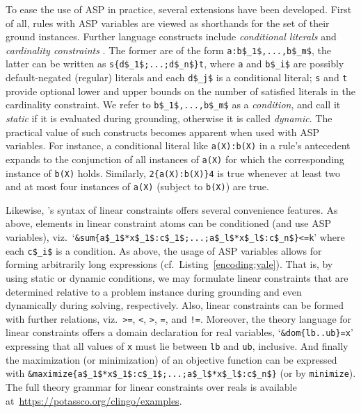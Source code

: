 To ease the use of ASP in practice, 
several extensions have been developed. 
First of all, rules with ASP variables are viewed as shorthands for the set of their ground instances.
Further language constructs include
\emph{conditional literals} and \emph{cardinality constraints} \cite{siniso02a}.
The former are of the form
\lstinline[mathescape]{a:b$_1$,...,b$_m$},
the latter can be written as
\lstinline[mathescape]+s{d$_1$;...;d$_n$}t+,
where \lstinline{a} and \lstinline[mathescape]{b$_i$} are possibly default-negated (regular) literals  %
and each \lstinline[mathescape]{d$_j$} is a conditional literal; %
\lstinline{s} and \lstinline{t} provide optional lower and upper bounds on the number of satisfied literals in the cardinality constraint.
We refer to \lstinline[mathescape]{b$_1$,...,b$_m$} as a \emph{condition},
and call it \textit{static} if it is evaluated during grounding, otherwise it is called \textit{dynamic}.
%
The practical value of such constructs becomes apparent when used with ASP variables. 
For instance, a conditional literal like
\lstinline[mathescape]{a(X):b(X)}
in a rule's antecedent expands to the conjunction of all instances of \lstinline{a(X)} for which the corresponding instance of \lstinline{b(X)} holds.
%
Similarly,
\lstinline[mathescape]+2{a(X):b(X)}4+
is true whenever at least two and at most four instances of \lstinline{a(X)} (subject to \lstinline{b(X)}) are true.
%

Likewise,
\clingo's syntax of linear constraints offers several convenience features.
As above,
elements in linear constraint atoms can be conditioned (and use ASP variables),
viz.\
`\lstinline[mathescape]@&sum{a$_1$*x$_1$:c$_1$;...;a$_l$*x$_l$:c$_n$}<=k@'
where each \lstinline[mathescape]{c$_i$} is a condition.
As above, the usage of ASP variables allows for forming arbitrarily long expressions
(cf.\ Listing~\ref{encoding:yale}).
That is, by using static or dynamic conditions,
we may formulate linear constraints that are determined relative to a problem instance during grounding
and even dynamically during solving, respectively. 
Also, linear constraints can be formed with further relations, viz.\
\texttt{>=},
\texttt{<},
\texttt{>},
\texttt{=},
and
\texttt{!=}.
Moreover, the theory language for linear constraints offers a domain declaration for real variables,
`\lstinline[mathescape]@&dom{lb..ub}=x@'
expressing that all values of \texttt{x} must lie between \texttt{lb} and \texttt{ub}, inclusive.
And finally the maximization (or minimization) of an objective function can be expressed with
\lstinline[mathescape]@&maximize{a$_1$*x$_1$:c$_1$;...;a$_l$*x$_l$:c$_n$}@
(or by \texttt{minimize}).
The full theory grammar for linear constraints over reals is available at~\url{https://potassco.org/clingo/examples}.


